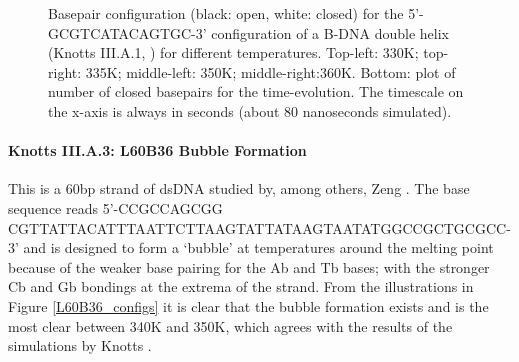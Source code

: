 \begin{figure}[h] \begin{minipage}{7cm}
 \end{minipage} \begin{minipage}{7cm}  \end{minipage}
\begin{minipage}{7cm}
 \end{minipage} \begin{minipage}{7cm}\end{minipage}\begin{center}

\caption{Basepair configuration (black: open, white: closed) for the 5'-GCGTCATACAGTGC-3' configuration of a B-DNA double helix (Knotts III.A.1, \cite{knotts2007coarse}) for different temperatures. Top-left: 330K; top-right: 335K; middle-left: 350K; middle-right:360K. Bottom: plot of number of closed basepairs for the time-evolution. The timescale on the x-axis is always in seconds (about 80 nanoseconds simulated).  } \label{knotts1_configs}\end{center}
\end{figure}

\paragraph{Knotts III.A.3: L60B36 Bubble Formation} This is a 60bp strand of dsDNA studied by, among others, Zeng \etal \cite{zeng2003length}. The base sequence reads 5'-CCGCCAGCGG CGTTATTACATTTAATTCTTAAGTATTATAAGTAATATGGCCGCTGCGCC-3' and is designed to form a `bubble' at temperatures around the melting point because of the weaker base pairing for the Ab and Tb bases; with the stronger Cb and Gb bondings at the extrema of the strand. From the illustrations in Figure \ref{L60B36_configs} it is clear that the bubble formation exists and is the most clear between 340K and 350K, which agrees with the results of the simulations by Knotts \etal \cite{knotts2007coarse}.

